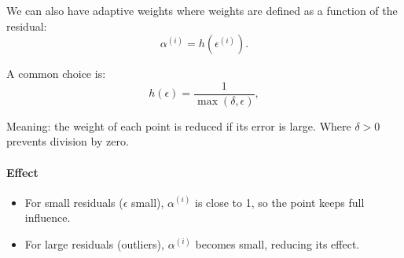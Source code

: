 \documentclass[11pt]{article}
\begin{document}
We can also have adaptive weights where weights are defined as a function of the residual:
\[
	\alpha^{(i)} = h(\epsilon^{(i)}).
\]

A common choice is:
\[
	h(\epsilon) = \frac{1}{\max(\delta, \epsilon)},
\]

Meaning: the weight of each point is reduced if its error is large. Where $\delta > 0$ prevents division by zero.

\paragraph{Effect}
\begin{itemize}
	\item For small residuals ($\epsilon$ small), $\alpha^{(i)}$ is close to 1, so the point keeps full influence.
	\item For large residuals (outliers), $\alpha^{(i)}$ becomes small, reducing its effect.
\end{itemize}
\end{document}
